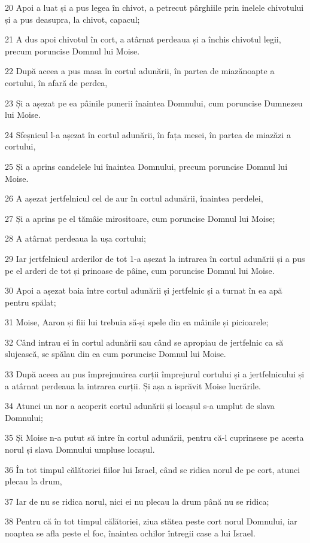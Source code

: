 \par 20 Apoi a luat și a pus legea în chivot, a petrecut pârghiile prin inelele chivotului și a pus deasupra, la chivot, capacul;
\par 21 A dus apoi chivotul în cort, a atârnat perdeaua și a închis chivotul legii, precum poruncise Domnul lui Moise.
\par 22 După aceea a pus masa în cortul adunării, în partea de miazănoapte a cortului, în afară de perdea,
\par 23 Și a așezat pe ea pâinile punerii înaintea Domnului, cum poruncise Dumnezeu lui Moise.
\par 24 Sfeșnicul l-a așezat în cortul adunării, în fața mesei, în partea de miazăzi a cortului,
\par 25 Și a aprins candelele lui înaintea Domnului, precum poruncise Domnul lui Moise.
\par 26 A așezat jertfelnicul cel de aur în cortul adunării, înaintea perdelei,
\par 27 Și a aprins pe el tămâie mirositoare, cum poruncise Domnul lui Moise;
\par 28 A atârnat perdeaua la ușa cortului;
\par 29 Iar jertfelnicul arderilor de tot 1-a așezat la intrarea în cortul adunării și a pus pe el arderi de tot și prinoase de pâine, cum poruncise Domnul lui Moise.
\par 30 Apoi a așezat baia între cortul adunării și jertfelnic și a turnat în ea apă pentru spălat;
\par 31 Moise, Aaron și fiii lui trebuia să-și spele din ea mâinile și picioarele;
\par 32 Când intrau ei în cortul adunării sau când se apropiau de jertfelnic ca să slujească, se spălau din ea cum poruncise Domnul lui Moise.
\par 33 După aceea au pus împrejmuirea curții împrejurul cortului și a jertfelnicului și a atârnat perdeaua la intrarea curții. Și așa a isprăvit Moise lucrările.
\par 34 Atunci un nor a acoperit cortul adunării și locașul s-a umplut de slava Domnului;
\par 35 Și Moise n-a putut să intre în cortul adunării, pentru că-l cuprinsese pe acesta norul și slava Domnului umpluse locașul.
\par 36 În tot timpul călătoriei fiilor lui Israel, când se ridica norul de pe cort, atunci plecau la drum,
\par 37 Iar de nu se ridica norul, nici ei nu plecau la drum până nu se ridica;
\par 38 Pentru că în tot timpul călătoriei, ziua stătea peste cort norul Domnului, iar noaptea se afla peste el foc, înaintea ochilor întregii case a lui Israel.


